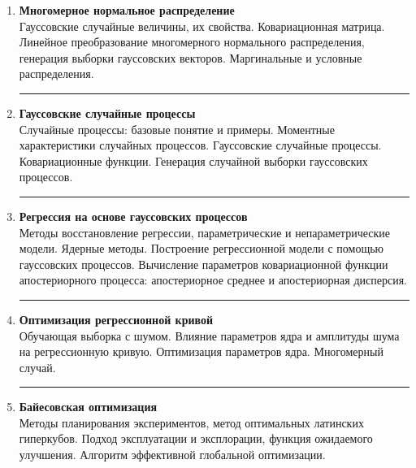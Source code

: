 \documentclass[12pt,oneside,openany]{article}
\begin{document}
\begin{enumerate}
  \item \textbf{Многомерное нормальное распределение} \\
  Гауссовские случайные величины, их свойства. Ковариационная матрица. Линейное преобразование многомерного нормального распределения, генерация выборки гауссовских векторов. Маргинальные и условные распределения.
  \begin{center}\rule{1.0\linewidth}{0.5pt}\end{center}

  \item \textbf{Гауссовские случайные процессы} \\
  Случайные процессы: базовые понятие и примеры. Моментные характеристики случайных процессов. Гауссовские случайные процессы. Ковариационные функции. Генерация случайной выборки гауссовских процессов.
  \begin{center}\rule{1.0\linewidth}{0.5pt}\end{center}

  \item \textbf{Регрессия на основе гауссовских процессов} \\
  Методы восстановление регрессии, параметрические и непараметрические модели. Ядерные методы. Построение регрессионной модели с помощью гауссовских процессов. Вычисление параметров ковариационной функции апостериорного процесса: апостериорное среднее и апостериорная дисперсия.
  \begin{center}\rule{1.0\linewidth}{0.5pt}\end{center}

  \item \textbf{Оптимизация регрессионной кривой} \\
  Обучающая выборка с шумом. Влияние параметров ядра и амплитуды шума на регрессионную кривую. Оптимизация параметров ядра. Многомерный случай.
  \begin{center}\rule{1.0\linewidth}{0.5pt}\end{center}

  \item \textbf{Байесовская оптимизация} \\
  Методы планирования экспериментов, метод оптимальных латинских гиперкубов. Подход эксплуатации и эксплорации, функция ожидаемого улучшения. Алгоритм эффективной глобальной оптимизации.

\end{enumerate}
\end{document}
